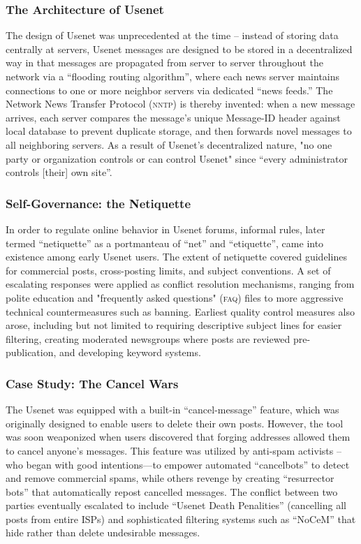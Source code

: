 \subsubsection{The Architecture of Usenet} The design of
Usenet was unprecedented at the time -- instead of storing data centrally at
servers, Usenet messages are designed to be stored in a decentralized way in
that messages are propagated from server to server throughout the network via a
``flooding routing algorithm'', where each news server maintains connections to
one or more neighbor servers via dedicated ``news feeds.'' \cite{HowUseUsenet}
The Network News Transfer Protocol (\textsc{nntp}) is thereby invented: when a
new message arrives, each server compares the message's unique Message-ID header
against local database to prevent duplicate storage, and then forwards novel
messages to all neighboring servers. As a result of Usenet's decentralized
nature, "no one party or organization controls or can control Usenet" since
``every administrator controls [their] own site''.

\subsubsection{Self-Governance: the Netiquette}

In order to regulate online behavior in Usenet forums, informal rules, later
termed ``netiquette'' as a portmanteau of ``net'' and ``etiquette'', came into
existence among early Usenet users.\cite{HowUseUsenet} The extent of netiquette
covered guidelines for commercial posts, cross-posting limits, and subject
conventions. A set of escalating responses were applied as conflict resolution
mechanisms, ranging from polite education and "frequently asked questions"
(\textsc{faq}) files to more aggressive technical countermeasures such as
banning. Earliest quality control measures also arose, including but not limited
to requiring descriptive subject lines for easier filtering, creating moderated
newsgroups where posts are reviewed pre-publication, and developing keyword
systems.

\subsubsection{Case Study: The Cancel Wars}
The Usenet was equipped with a built-in ``cancel-message'' feature, which was
originally designed to enable users to delete their own posts. However, the tool
was soon weaponized when users discovered that forging addresses allowed them to
cancel anyone's messages. This feature was utilized by anti-spam activists --
who began with good intentions---to empower automated ``cancelbots'' to detect
and remove commercial spams, while others revenge by creating ``resurrector
bots'' that automatically repost cancelled messages. The conflict between two
parties eventually escalated to include ``Usenet Death Penalities'' (cancelling
all posts from entire ISPs) and sophisticated filtering systems such as
``NoCeM'' that hide rather than delete undesirable messages.

